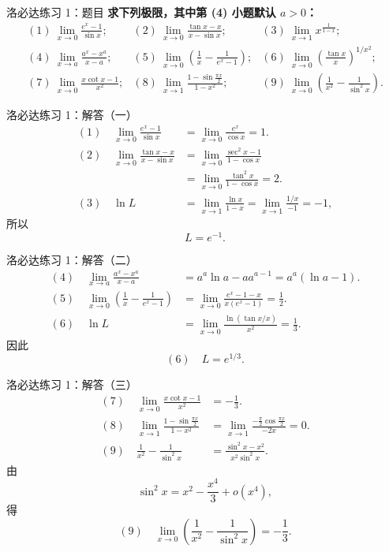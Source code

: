 \documentclass[aspectratio=169,11pt]{ctexbeamer}
\begin{document}
\begin{frame}{洛必达练习 1：题目}
\scriptsize
\textbf{求下列极限，其中第 (4) 小题默认 $a>0$：}
\[
\begin{array}{lll}
(1)\ \displaystyle\lim_{x\to0}\frac{e^x-1}{\sin x};&
(2)\ \displaystyle\lim_{x\to0}\frac{\tan x-x}{x-\sin x};&
(3)\ \displaystyle\lim_{x\to1}x^{\frac1{1-x}};\\[1.2em]
(4)\ \displaystyle\lim_{x\to a}\frac{a^x-x^a}{x-a};&
(5)\ \displaystyle\lim_{x\to0}\left(\frac1x-\frac1{e^x-1}\right);&
(6)\ \displaystyle\lim_{x\to0}\left(\frac{\tan x}{x}\right)^{1/x^2};\\[1.2em]
(7)\ \displaystyle\lim_{x\to0}\frac{x\cot x-1}{x^2};&
(8)\ \displaystyle\lim_{x\to1}\frac{1-\sin\frac{\pi x}{2}}{1-x^2};&
(9)\ \displaystyle\lim_{x\to0}\left(\frac1{x^2}-\frac1{\sin^2 x}\right).
\end{array}
\]
\end{frame}

\begin{frame}{洛必达练习 1：解答（一）}
\small
\[
\begin{aligned}
(1)\quad
\lim_{x\to0}\frac{e^x-1}{\sin x}
&=\lim_{x\to0}\frac{e^x}{\cos x}=1.\\[0.6em]
(2)\quad
\lim_{x\to0}\frac{\tan x-x}{x-\sin x}
&=\lim_{x\to0}\frac{\sec^2x-1}{1-\cos x}\\
&=\lim_{x\to0}\frac{\tan^2x}{1-\cos x}=2.\\[0.6em]
(3)\quad
\ln L&=\lim_{x\to1}\frac{\ln x}{1-x}
=\lim_{x\to1}\frac{1/x}{-1}=-1,
\end{aligned}
\]
所以
\[
  L=e^{-1}.
\]
\end{frame}

\begin{frame}{洛必达练习 1：解答（二）}
\small
\[
\begin{aligned}
(4)\quad
\lim_{x\to a}\frac{a^x-x^a}{x-a}
&=a^a\ln a-a a^{a-1}
=a^a(\ln a-1).\\[0.8em]
(5)\quad
\lim_{x\to0}\left(\frac1x-\frac1{e^x-1}\right)
&=\lim_{x\to0}\frac{e^x-1-x}{x(e^x-1)}
=\frac12.\\[0.8em]
(6)\quad
\ln L
&=\lim_{x\to0}\frac{\ln(\tan x/x)}{x^2}
=\frac13.
\end{aligned}
\]
因此
\[
  (6)\quad L=e^{1/3}.
\]
\end{frame}

\begin{frame}{洛必达练习 1：解答（三）}
\small
\[
\begin{aligned}
(7)\quad
\lim_{x\to0}\frac{x\cot x-1}{x^2}
&=-\frac13.\\[0.8em]
(8)\quad
\lim_{x\to1}\frac{1-\sin\frac{\pi x}{2}}{1-x^2}
&=\lim_{x\to1}
\frac{-\frac{\pi}{2}\cos\frac{\pi x}{2}}{-2x}=0.\\[0.8em]
(9)\quad
\frac1{x^2}-\frac1{\sin^2x}
&=\frac{\sin^2x-x^2}{x^2\sin^2x}.
\end{aligned}
\]
由
\[
  \sin^2x=x^2-\frac{x^4}{3}+o(x^4),
\]
得
\[
  (9)\quad \lim_{x\to0}\left(\frac1{x^2}-\frac1{\sin^2x}\right)=-\frac13.
\]
\end{frame}
\end{document}
